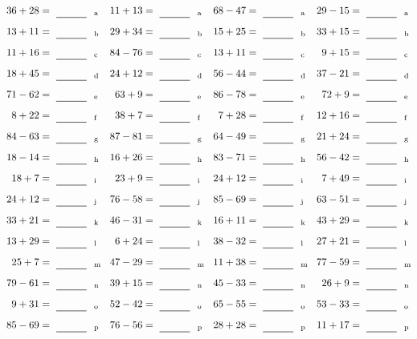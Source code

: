 \documentclass
[
  draft    = true,
  fontsize = 11pt,
  parskip  = half-
]
{scrartcl}
\begin{document}
\clearpage
\begin{align*}
    \pline{36+28}&=\rline{a}
  & \pline{11+13}&=\rline{a}
  & \pline{68-47}&=\rline{a}
  & \pline{29-15}&=\rline{a} \\[1ex]
    \pline{13+11}&=\rline{b}
  & \pline{29+34}&=\rline{b}
  & \pline{15+25}&=\rline{b}
  & \pline{33+15}&=\rline{b} \\[1ex]
    \pline{11+16}&=\rline{c}
  & \pline{84-76}&=\rline{c}
  & \pline{13+11}&=\rline{c}
  & \pline{9+15}&=\rline{c} \\[1ex]
    \pline{18+45}&=\rline{d}
  & \pline{24+12}&=\rline{d}
  & \pline{56-44}&=\rline{d}
  & \pline{37-21}&=\rline{d} \\[1ex]
    \pline{71-62}&=\rline{e}
  & \pline{63+9}&=\rline{e}
  & \pline{86-78}&=\rline{e}
  & \pline{72+9}&=\rline{e} \\[1ex]
    \pline{8+22}&=\rline{f}
  & \pline{38+7}&=\rline{f}
  & \pline{7+28}&=\rline{f}
  & \pline{12+16}&=\rline{f} \\[1ex]
    \pline{84-63}&=\rline{g}
  & \pline{87-81}&=\rline{g}
  & \pline{64-49}&=\rline{g}
  & \pline{21+24}&=\rline{g} \\[1ex]
    \pline{18-14}&=\rline{h}
  & \pline{16+26}&=\rline{h}
  & \pline{83-71}&=\rline{h}
  & \pline{56-42}&=\rline{h} \\[1ex]
    \pline{18+7}&=\rline{i}
  & \pline{23+9}&=\rline{i}
  & \pline{24+12}&=\rline{i}
  & \pline{7+49}&=\rline{i} \\[1ex]
    \pline{24+12}&=\rline{j}
  & \pline{76-58}&=\rline{j}
  & \pline{85-69}&=\rline{j}
  & \pline{63-51}&=\rline{j} \\[1ex]
    \pline{33+21}&=\rline{k}
  & \pline{46-31}&=\rline{k}
  & \pline{16+11}&=\rline{k}
  & \pline{43+29}&=\rline{k} \\[1ex]
    \pline{13+29}&=\rline{l}
  & \pline{6+24}&=\rline{l}
  & \pline{38-32}&=\rline{l}
  & \pline{27+21}&=\rline{l} \\[1ex]
    \pline{25+7}&=\rline{m}
  & \pline{47-29}&=\rline{m}
  & \pline{11+38}&=\rline{m}
  & \pline{77-59}&=\rline{m} \\[1ex]
    \pline{79-61}&=\rline{n}
  & \pline{39+15}&=\rline{n}
  & \pline{45-33}&=\rline{n}
  & \pline{26+9}&=\rline{n} \\[1ex]
    \pline{9+31}&=\rline{o}
  & \pline{52-42}&=\rline{o}
  & \pline{65-55}&=\rline{o}
  & \pline{53-33}&=\rline{o} \\[1ex]
    \pline{85-69}&=\rline{p}
  & \pline{76-56}&=\rline{p}
  & \pline{28+28}&=\rline{p}
  & \pline{11+17}&=\rline{p}
\end{align*}
\end{document}
